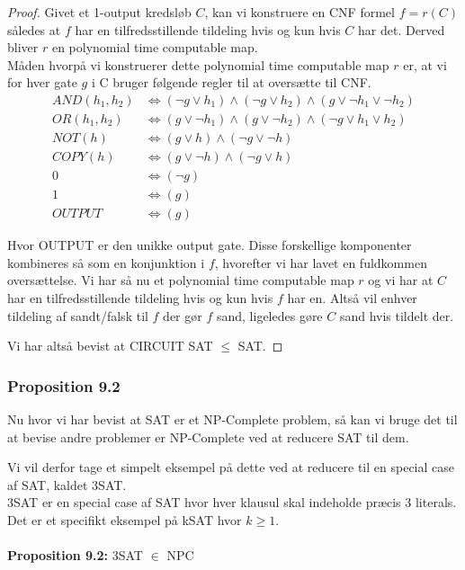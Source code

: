 \begin{proof} Givet et 1-output kredsløb $C$, kan vi konstruere en CNF formel
$f = r(C)$ således at $f$ har en tilfredsstillende tildeling hvis og kun hvis
$C$ har det. Derved bliver $r$ en polynomial time computable map.\\

Måden hvorpå vi konstruerer dette polynomial time computable map $r$ er, at
vi for hver gate $g$ i C bruger følgende regler til at oversætte til CNF.
\begin{align*} AND(h_1,h_2) &\Leftrightarrow (\neg g \vee h_1) \wedge (\neg g
\vee h_2) \wedge (g \vee \neg h_1 \vee \neg h_2) \\ OR(h_1,h_2) &\Leftrightarrow
(g \vee \neg h_1) \wedge (g \vee \neg h_2) \wedge (\neg g \vee h_1 \vee h_2)
\\ NOT(h) &\Leftrightarrow (g \vee h) \wedge (\neg g \vee \neg h) \\ COPY(h)
&\Leftrightarrow (g \vee \neg h) \wedge (\neg g \vee h) \\ 0 &\Leftrightarrow
(\neg g) \\ 1 &\Leftrightarrow (g) \\ OUTPUT &\Leftrightarrow (g) \end{align*}

Hvor OUTPUT er den unikke output gate. Disse forskellige komponenter
kombineres så som en konjunktion i $f$, hvorefter vi har lavet en fuldkommen
oversættelse. Vi har så nu et polynomial time computable map $r$ og vi har at
$C$ har en tilfredsstillende tildeling hvis og kun hvis $f$ har en. Altså vil
enhver tildeling af sandt/falsk til $f$ der gør $f$ sand, ligeledes gøre $C$
sand hvis tildelt der.

Vi har altså bevist at CIRCUIT SAT $\leq$ SAT.

\end{proof}


\subsubsection{Proposition 9.2}

Nu hvor vi har bevist at SAT er et NP-Complete problem, så kan vi bruge det til
at bevise andre problemer er NP-Complete ved at reducere SAT til dem.

Vi vil derfor tage et simpelt eksempel på dette ved at reducere til en special
case af SAT, kaldet 3SAT.\\ 3SAT er en special case af SAT hvor hver klausul
skal indeholde præcis 3 literals. Det er et specifikt eksempel på kSAT hvor $k
\geq 1$.\\ ~\\ \textbf{Proposition 9.2:} 3SAT $\in$ NPC

